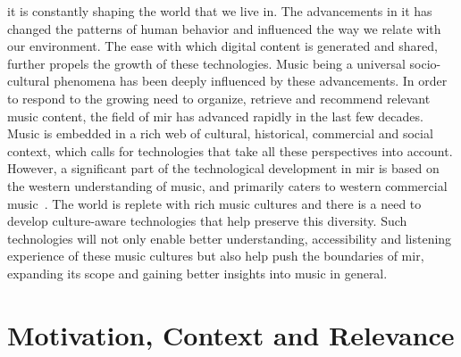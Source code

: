 \Gls{it} is constantly shaping the world that we live in. The advancements in \gls{it} has changed the patterns of human behavior and influenced the way we relate with our environment. The ease with which digital content is generated and shared, further propels the growth of these technologies. Music being a universal socio-cultural phenomena has been deeply influenced by these advancements. In order to respond to the growing need to organize, retrieve and recommend relevant music content, the field of \gls{mir} has advanced rapidly in the last few decades. Music is embedded in a rich web of cultural, historical, commercial and social context, which calls for technologies that take all these perspectives into account. However, a significant part of the technological development in \gls{mir} is based on the western understanding of music, and primarily caters to western commercial music~\citep{XavierSerra2011}. The world is replete with rich music cultures and there is a need to develop culture-aware technologies that help preserve this diversity. Such technologies will not only enable better understanding, accessibility and listening experience of these music cultures but also help push the boundaries of \gls{mir}, expanding its scope and gaining better insights into music in general.



\section{Motivation, Context and Relevance}
\label{sec:intro_motivation_context_relevance}


\subsection{}
\label{sec:intro_motivation_mir}

